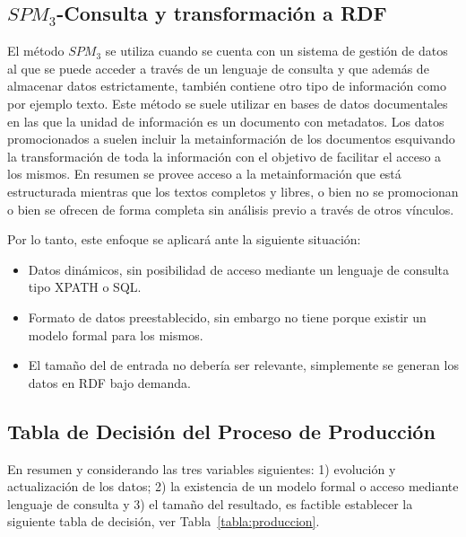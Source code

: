 \subsection{$SPM_3$-Consulta y transformación a RDF}
El método $SPM_3$ se utiliza cuando se cuenta con un sistema de gestión de datos al que se puede acceder 
a través de un lenguaje de consulta y que además de almacenar 
datos estrictamente, también contiene otro tipo de información como por ejemplo texto. Este método se suele
utilizar en bases de datos documentales en las que la unidad de información es un 
documento con metadatos. Los datos promocionados a \linkeddata suelen incluir
la metainformación de los documentos esquivando la transformación de toda la información
con el objetivo de facilitar el acceso a los mismos. En resumen se provee acceso
a la metainformación que está estructurada mientras que los textos completos y libres, o bien no se promocionan o bien se ofrecen de forma completa 
sin análisis previo a través de otros vínculos.


Por lo tanto, este enfoque se aplicará ante la siguiente situación:
\begin{itemize}
 \item Datos dinámicos, sin posibilidad de acceso mediante un lenguaje de consulta tipo XPATH o SQL.
 \item Formato de datos preestablecido, sin embargo no tiene porque existir un modelo formal para los mismos.
 \item El tamaño del \dataset de entrada no debería ser relevante, simplemente se generan los datos en RDF bajo demanda.
\end{itemize}


\subsection{Tabla de Decisión del Proceso de Producción}
En resumen y considerando las tres variables siguientes: 1) evolución y actualización de los datos; 2) la existencia
de un modelo formal o acceso mediante lenguaje de consulta y 3) el tamaño del \dataset resultado, es factible establecer
la siguiente tabla de decisión, ver Tabla~\ref{tabla:produccion}.

